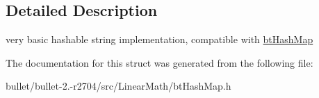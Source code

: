 \subsection{Detailed Description}
very basic hashable string implementation, compatible with \hyperlink{classbt_hash_map}{bt\+Hash\+Map} 

The documentation for this struct was generated from the following file\+:\begin{DoxyCompactItemize}
\item 
bullet/bullet-\/2.-\/r2704/src/\+Linear\+Math/bt\+Hash\+Map.\+h\end{DoxyCompactItemize}
